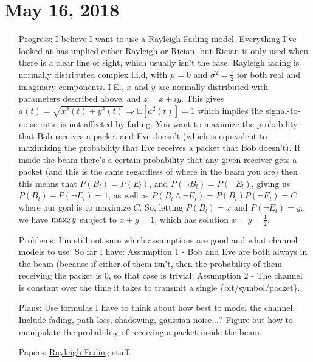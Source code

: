 \documentclass[11pt]{article}
\begin{document}
\section{May 16, 2018}
\begin{itemize}
\item[Progress:]
I believe I want to use a Rayleigh Fading model.  Everything I've looked at has implied either Rayleigh or Rician, but Rician is only used when there is a clear line of sight, which usually isn't the case.  Rayleigh fading is normally distributed complex i.i.d, with $\mu = 0$ and $\sigma^{2} = \frac{1}{2}$ for both real and imaginary components.  I.E., $x$ and $y$ are normally distributed with parameters described above, and $z = x + iy$.  This gives $a(t) = \sqrt{x^{2}(t) + y^{2}(t)} \Rightarrow \mathbb{E}[a^{2}(t)] = 1$ which implies the signal-to-noise ratio is not affected by fading.\newline
You want to maximize the probability that Bob receives a packet and Eve doesn't (which is equivalent to maximizing the probability that Eve receives a packet that Bob doesn't).  If inside the beam there's a certain probability that any given receiver gets a packet (and this is the same regardless of where in the beam you are) then this means that $P(B_{l}) = P(E_{l})$, and $P(\lnot B_{l}) = P(\lnot E_{l})$, giving us $P(B_{l}) + P(\lnot E_{l}) = 1$, as well as $P(B_{l} \land \lnot E_{l}) = P(B_{l})P(\lnot E_{l}) = C$ where our goal is to maximize $C$.  So, letting $P(B_{l}) = x$ and $P(\lnot E_{l}) = y$, we have $\textnormal{max} xy$ subject to $x+y = 1$, which has solution $x = y = \frac{1}{2}$.

\item[Problems:]
I'm still not sure which assumptions are good and what channel models to use.  So far I have: Assumption 1 - Bob and Eve are both always in the beam (because if either of them isn't, then the probability of them receiving the packet is 0, so that case is trivial; Assumption 2 - The channel is constant over the time it takes to transmit a single \{bit/symbol/packet\}.

\item[Plans:]
Use formulas I have to think about how best to model the channel.  Include fading, path loss, shadowing, gaussian noise...?\newline
Figure out how to manipulate the probability of receiving a packet inside the beam.

\item[Papers:]
\href{https://ieeexplore.ieee.org/stamp/stamp.jsp?arnumber=380184}{Rayleigh Fading} stuff.

\end{itemize}
\end{document}
